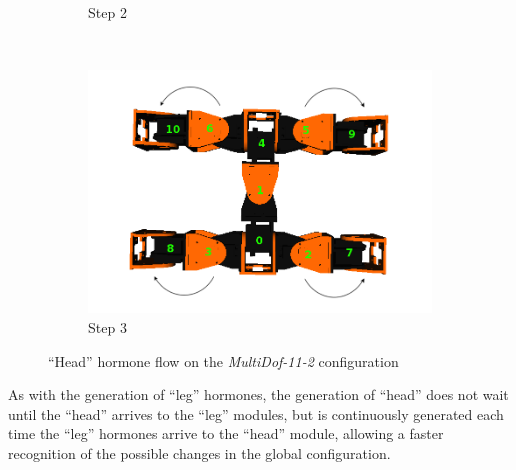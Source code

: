 \begin{figure}[h]
\begin{subfigure}[b]{0.4\textwidth}
                \caption{Step 2}
                \label{fig:11_2_step2_head}
        \end{subfigure}
        ~
        \begin{subfigure}[b]{0.4\textwidth}
                \centering
                \includegraphics[width=\textwidth]{images/Hormone_protocol_11_2_head_step3.png}
                \caption{Step 3}
                \label{fig:11_2_step3_head}
        \end{subfigure}
        \caption{``Head'' hormone flow on the \emph{MultiDof-11-2} configuration}\label{fig:global_conf_discovery_11_2_head}
\end{figure}

As with the generation of ``leg'' hormones, the generation of ``head'' does not wait until the ``head'' arrives to the ``leg'' modules, but is continuously generated each time the ``leg'' hormones arrive to the ``head'' module, allowing a faster recognition of the possible changes in the global configuration.\\